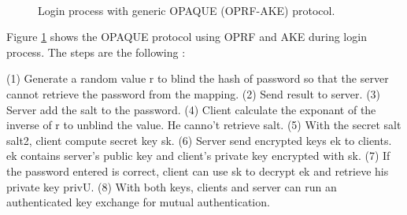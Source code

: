\documentclass[../report.tex]{subfiles}
\begin{document}
\paragraph{}

\begin{figure}[h]
 \centering

 \setlength{\fboxsep}{10pt}
 \setlength{\fboxrule}{1pt}

 \caption{Login process with generic OPAQUE (OPRF-AKE) protocol.}
 \label{fig:OPAQUE_AKE}
\end{figure}

Figure \ref{fig:OPAQUE_AKE} shows the OPAQUE protocol using OPRF and AKE during login process.
The steps are the following :

(1) Generate a random value r to blind the hash of password so that the server cannot retrieve the password from the mapping.
(2) Send result to server.
(3) Server add the salt to the password.
(4) Client calculate the exponant of the inverse of r to unblind the value. He canno't retrieve salt.
(5) With the secret salt salt2, client compute secret key sk.
(6) Server send encrypted keys ek to clients. ek contains server's public key and client's private key encrypted with sk.
(7) If the password entered is correct, client can use sk to decrypt ek and retrieve his private key privU.
(8) With both keys, clients and server can run an authenticated key exchange for mutual authentication.
\end{document}
